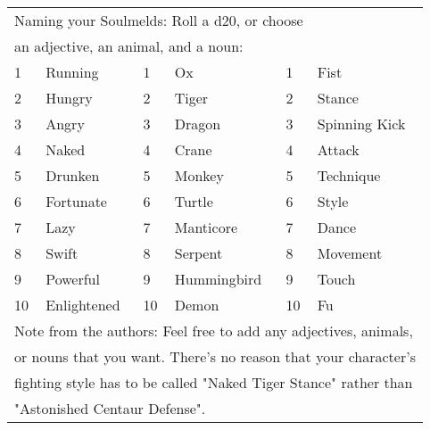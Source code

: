 \begin{table}[tbh]
\begin{small}
\begin{center}
\noindent \begin{tabular}{|ll||ll||ll|}
\multicolumn{6}{l}{Naming your Soulmelds: Roll a d20, or choose}\\
\multicolumn{6}{l}{an adjective, an animal, and a noun:} \\
\hline 1&Running&1&Ox&1&Fist\\
2&Hungry&2&Tiger&2&Stance\\
3&Angry&3&Dragon&3&Spinning Kick\\
4&Naked&4&Crane&4&Attack\\
5&Drunken&5&Monkey&5&Technique\\
6&Fortunate&6&Turtle&6&Style\\
7&Lazy&7&Manticore&7&Dance\\
8&Swift&8&Serpent&8&Movement\\
9&Powerful&9&Hummingbird&9&Touch\\
10&Enlightened&10&Demon&10&Fu\\ \hline
\multicolumn{6}{l}{Note from the authors: Feel free to add any adjectives, animals,}\\
\multicolumn{6}{l}{or nouns that you want.  There's no reason that your character's}\\
\multicolumn{6}{l}{fighting style has to be called "Naked Tiger Stance" rather than}\\
\multicolumn{6}{l}{"Astonished Centaur Defense".}\\
\end{tabular}
\end{center}
\end{small}
\end{table}



